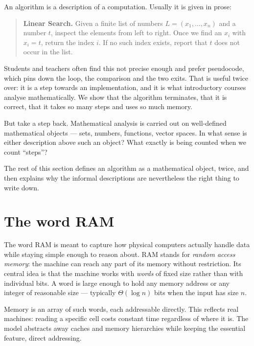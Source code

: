An algorithm is a description of a computation. Usually it is given in prose:

\begin{quote}
\textbf{Linear Search.} Given a finite list of numbers
$L = (x_1, \ldots, x_n)$ and a number $t$, inspect the elements from left to
right. Once we find an $x_i$ with $x_i = t$, return the index $i$. If no such
index exists, report that $t$ does not occur in the list.
\end{quote}

Students and teachers often find this not precise enough and prefer
pseudocode, which pins down the loop, the comparison and the two exits. That is
useful twice over: it is a step towards an implementation, and it is what
introductory courses analyse mathematically. We show that the algorithm
terminates, that it is correct, that it takes so many steps and uses so much
memory.

But take a step back. Mathematical analysis is carried out on well-defined
mathematical objects --- sets, numbers, functions, vector spaces. In what sense
is either description above such an object? What exactly is being counted when
we count ``steps''?

The rest of this section defines an algorithm as a mathematical object, twice,
and then explains why the informal descriptions are nevertheless the right
thing to write down.

\section{The word RAM}
\label{sec:word-ram}

The word RAM is meant to capture how physical computers actually handle data
while staying simple enough to reason about. RAM stands for \emph{random access
memory}: the machine can reach any part of its memory without restriction. Its
central idea is that the machine works with \emph{words} of fixed size rather
than with individual bits. A word is large enough to hold any memory address or
any integer of reasonable size --- typically $\Theta(\log n)$ bits when the
input has size $n$.

Memory is an array of such words, each addressable directly. This reflects real
machines: reading a specific cell costs constant time regardless of where it
is. The model abstracts away caches and memory hierarchies while keeping the
essential feature, direct addressing.

